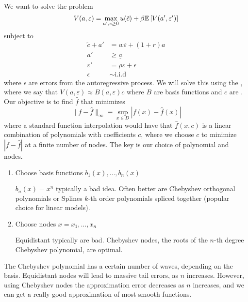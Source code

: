\documentclass[10pt]{article}
\begin{document}
\begin{example}
	 We want to solve the problem\[V(a,\varepsilon) = \max_{a',\tilde{c} \ge 0} u(\tilde{c}) + \beta \mathbb{E}\left[ V(a',\varepsilon')\right]\]subject to\begin{align*} \tilde{c} + a' &= w\varepsilon + (1+r)a \\ a' &\ge \underline{a} \\ \varepsilon' &= \rho \varepsilon + \epsilon \\ \epsilon &\sim \text{i.i.d}\end{align*}where $\epsilon$ are errors from the autoregressive process. We will solve this using the , where we say that $V(a,\varepsilon) \approx B(a,\varepsilon)c$ where $B$ are basis functions and $c$ are . Our objective is to find $\hat{f}$ that minimizes \[\|f-\hat{f}\|_\infty \equiv \sup_{x \in D} |f(x) - \hat{f}(x)|\]where a standard function interpolation would have that $\hat{f}(x,c)$ is a linear combination of polynomials with coefficients $c$, where we choose $c$ to minimize $|f - \hat{f}|$ at a finite number of nodes. The key is our choice of polynomial and nodes. 
\end{example}
\begin{algorithm}
	\begin{enumerate}
		\item Choose basis functions $b_1(x),\dots,b_n(x)$ \begin{remark}
			$b_n(x) = x^n$ typically a bad idea. Often better are Chebyshev orthogonal polynomials or Splines $k$-th order polynomials spliced together (popular choice for linear models).
		\end{remark}
		\item Choose nodes $x = x_1,\dots,x_n$ \begin{remark}
			Equidistant typically are bad. Chebyshev nodes, the roots of the $n$-th degree Chebyshev polynomial, are optimal.
		\end{remark}
	\end{enumerate}
\end{algorithm}

The Chebyshev polynomial has a certain number of waves, depending on the basis. Equidistant nodes will lead to massive tail errors, as $n$ increases. However, using Chebyshev nodes the approximation error decreases as $n$ increases, and we can get a really good approximation of most smooth functions.
\end{document}
